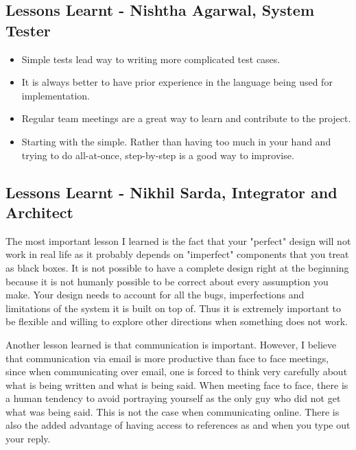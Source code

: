 \documentclass[letterpaper,11pt]{article}
\begin{document}
{\begin{itemize}
\end{itemize}

\subsection{Lessons Learnt - Nishtha Agarwal, System Tester}

\begin{itemize}

\item Simple tests lead way to writing more complicated test cases. 
\item It is always better to have prior experience in the language being used for implementation.
\item Regular team meetings are a great way to learn and contribute to the project.
\item Starting with the simple. Rather than having too much in your hand and trying to do all-at-once, step-by-step is a good way to improvise. 

\end{itemize}

\subsection{Lessons Learnt - Nikhil Sarda, Integrator and Architect}

The most important lesson I learned is the fact that your "perfect" design will not work in real life as it probably depends on "imperfect"
components that you treat as black boxes. It is not possible to have a complete design right at the beginning because it is not humanly possible to be correct about every assumption you make. Your design needs to account for all the bugs, imperfections and limitations of the system it is built on
top of. Thus it is extremely important to be flexible and willing to explore other directions when something does not work.

Another lesson learned is that communication is important. However, I believe that communication via email is more productive than face to face meetings, since when communicating over email, one is forced to think very carefully about what is being written and what is being said. When meeting face to face, there is a human tendency to avoid portraying yourself as the only guy who did not get what was being said. This is not the case when
communicating online. There is also the added advantage of having access to references as and when you type out your reply.

}
\end{document}
